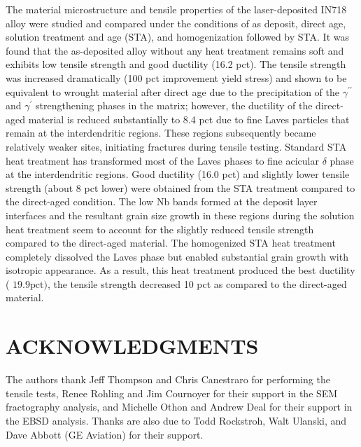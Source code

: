 \documentclass[10pt]{article}
\begin{document}
The material microstructure and tensile properties of the laser-deposited IN718 alloy were studied and compared under the conditions of as deposit, direct age, solution treatment and age (STA), and homogenization followed by STA. It was found that the as-deposited alloy without any heat treatment remains soft and exhibits low tensile strength and good ductility (16.2 pct). The tensile strength was increased dramatically (100 pct improvement yield stress) and shown to be equivalent to wrought material after direct age due to the precipitation of the $\gamma^{\prime \prime}$ and $\gamma^{\prime}$ strengthening phases in the matrix; however, the ductility of the direct-aged material is reduced substantially to 8.4 pct due to fine Laves particles that remain at the interdendritic regions. These regions subsequently became relatively weaker sites, initiating fractures during tensile testing. Standard STA heat treatment has transformed most of the Laves phases to fine acicular $\delta$ phase at the interdendritic regions. Good ductility (16.0 pct) and slightly lower tensile strength (about 8 pct lower) were obtained from the STA treatment compared to the direct-aged condition. The low $\mathrm{Nb}$ bands formed at the deposit layer interfaces and the resultant grain size growth in these regions during the solution heat treatment seem to account for the slightly reduced tensile strength compared to the direct-aged material. The homogenized STA heat treatment completely dissolved the Laves phase but enabled substantial grain growth with isotropic appearance. As a result, this heat treatment produced the best ductility ( $19.9 \mathrm{pct})$, the tensile strength decreased 10 pct as compared to the direct-aged material.

\section*{ACKNOWLEDGMENTS}
The authors thank Jeff Thompson and Chris Canestraro for performing the tensile tests, Renee Rohling and Jim Cournoyer for their support in the SEM fractography analysis, and Michelle Othon and Andrew Deal for their support in the EBSD analysis. Thanks are also due to Todd Rockstroh, Walt Ulanski, and Dave Abbott (GE Aviation) for their support.
\end{document}
